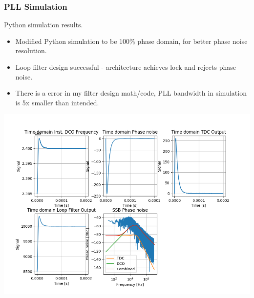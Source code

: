 \documentclass[t, screen, aspectratio=43]{beamer}
\begin{document}
\begin{frame}
	\frametitle{PLL Simulation}
	\begin{block}{Python simulation results.}
	\begin{minipage}{3cm}
		\begin{itemize}
			\tiny
			\item Modified Python simulation to be 100\% phase domain, for better phase noise resolution.
			\item Loop filter design successful - architecture achieves lock and rejects phase noise.
			\item There is a error in my filter design math/code, PLL bandwidth in simulation is 5x smaller than intended.
		\end{itemize} 	
	\end{minipage}
	\begin{minipage}{8cm}
		\center\includegraphics[width=1.1\textwidth, angle=0]{simulation_phase_domain.png}
	\end{minipage}
	\end{block}
\end{frame}
\end{document}

